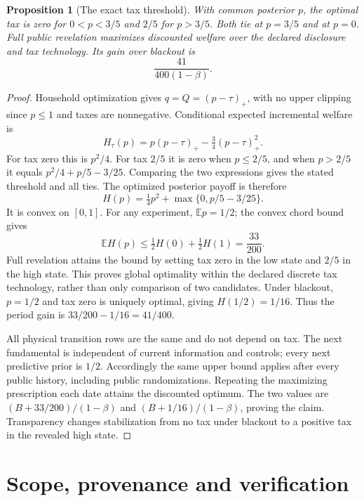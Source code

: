 \documentclass[11pt,a4paper]{article}
\newtheorem{proposition}[theorem]{Proposition}
\newcommand{\E}{\mathbb E}
\begin{document}
\begin{proposition}[The exact tax threshold]\label{prop:tax}
With common posterior $p$, the optimal tax is zero for $0<p<3/5$ and $2/5$
for $p>3/5$. Both tie at $p=3/5$ and at $p=0$. Full public revelation
maximizes discounted welfare over the declared disclosure and tax technology.
Its gain over blackout is
\[
 \frac{41}{400(1-\beta)}.
\]
\end{proposition}
\begin{proof}
Household optimization gives $q=Q=(p-\tau)_+$, with no upper clipping since
$p\leq1$ and taxes are nonnegative. Conditional expected incremental welfare is
\[
 H_\tau(p)=p(p-\tau)_+-\tfrac34(p-\tau)_+^2.
\]
For tax zero this is $p^2/4$. For tax $2/5$ it is zero when $p\leq2/5$,
and when $p>2/5$ it equals
$p^2/4+p/5-3/25$. Comparing the two expressions gives the stated threshold
and all ties. The optimized posterior payoff is therefore
\[
 H(p)=\tfrac14p^2+\max\{0,p/5-3/25\}.
\]
It is convex on $[0,1]$. For any experiment, $\E p=1/2$; the convex chord
bound gives
\[
 \E H(p)\leq\tfrac12H(0)+\tfrac12H(1)=\frac{33}{200}.
\]
Full revelation attains the bound by setting tax zero in the low state and
$2/5$ in the high state. This proves global optimality within the declared
discrete tax technology, rather than only comparison of two candidates.
Under blackout, $p=1/2$ and tax zero is uniquely optimal, giving $H(1/2)=1/16$.
Thus the period gain is $33/200-1/16=41/400$.

All physical transition rows are the same and do not depend on tax. The
next fundamental is independent of current information and controls; every
next predictive prior is $1/2$. Accordingly the same upper bound applies
after every public history, including public randomizations. Repeating the
maximizing prescription each date attains the discounted optimum. The two
values are $(B+33/200)/(1-\beta)$ and $(B+1/16)/(1-\beta)$, proving the
claim. Transparency changes stabilization from no tax under blackout to a
positive tax in the revealed high state.
\end{proof}

\section{Scope, provenance and verification}
\end{document}
